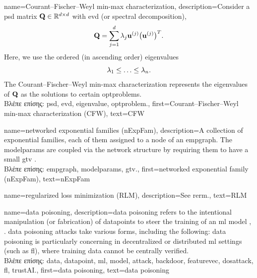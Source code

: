 {name={Courant–Fischer–Weyl min-max characterization}, 
	description={Consider a \gls{psd} 
		matrix $\mathbf{Q} \in \mathbb{R}^{d \times d}$ with \gls{evd} (or spectral decomposition), 
		$$\mathbf{Q} = \sum_{j=1}^{d} \lambda_{j} {\bf u}^{(j)} \big(  {\bf u}^{(j)}  \big)^{T}.$$ 
		Here, we use the ordered (in ascending order) \gls{eigenvalue}s 
		\begin{equation}
			\nonumber
			 \lambda_{1}  \leq  \ldots \leq \lambda_{n}. 
		\end{equation}
		The Courant–Fischer–Weyl min-max characterization \cite[Th. 8.1.2]{GolubVanLoanBook} 
		represents the \gls{eigenvalue}s of $\mathbf{Q}$ as the solutions to certain \gls{optproblem}s.\\
		\foreignlanguage{greek}{Βλέπε επίσης:} \gls{psd}, \gls{evd}, \gls{eigenvalue}, \gls{optproblem}.}, 
	first={Courant–Fischer–Weyl min-max characterization (CFW)}, 
	text={CFW}
}

{name={networked exponential families (nExpFam)}, 
	description={A collection of exponential 
		families, each of them assigned to a node of an \gls{empgraph}. The \gls{modelparams} are coupled 
	   	via the network structure by requiring them to have a small \gls{gtv} \cite{JungNetExp2020}.\\
	   	\foreignlanguage{greek}{Βλέπε επίσης:} \gls{empgraph}, \gls{modelparams}, \gls{gtv}.},
	  first={networked exponential family (nExpFam)},
	  text={nExpFam}  
}

 {name={regularized loss minimization (RLM)},
 	description={See \gls{rerm}.},
 	text={RLM}
 }
 
{name={data poisoning}, 
 	description={\Gls{data} poisoning refers to the intentional manipulation 
  		(or fabrication) of \gls{datapoint}s to steer the training of an \gls{ml} \gls{model} \cite{Liu2021}, \cite{PoisonGAN}. 
  		\Gls{data} poisoning \gls{attack}s take various forms, including the following:
		\Gls{data} poisoning is particularly concerning in decentralized or distributed \gls{ml} settings (such as \gls{fl}), 
		where training \gls{data} cannot be centrally verified. \\
		\foreignlanguage{greek}{Βλέπε επίσης:} \gls{data}, \gls{datapoint}, \gls{ml}, \gls{model}, \gls{attack}, \gls{backdoor}, 
		\gls{featurevec}, \gls{dosattack}, \gls{fl}, \gls{trustAI}.},
	first={data poisoning},
	text={data poisoning}
}

